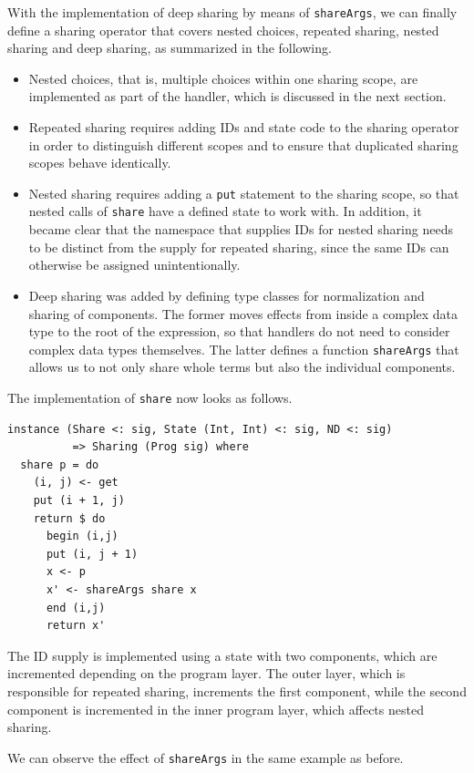 \documentclass[a4paper, 11pt, fleqn, twoside, abstract=on]{scrreprt}
\newcommand{\hinl}[1]{\texttt{#1}}
\begin{document}
With the implementation of deep sharing by means of \hinl{shareArgs}, we can finally define a sharing operator that covers nested choices, repeated sharing, nested sharing and deep sharing, as summarized in the following.

\begin{itemize}
\item Nested choices, that is, multiple choices within one sharing scope, are implemented as part of the handler, which is discussed in the next section.
\item Repeated sharing requires adding IDs and state code to the sharing operator in order to distinguish different scopes and to ensure that duplicated sharing scopes behave identically.
\item Nested sharing requires adding a \hinl{put} statement to the sharing scope, so that nested calls of \hinl{share} have a defined state to work with.
      In addition, it became clear that the namespace that supplies IDs for nested sharing needs to be distinct from the supply for repeated sharing, since the same IDs can otherwise be assigned unintentionally.
\item Deep sharing was added by defining type classes for normalization and sharing of components.
      The former moves effects from inside a complex data type to the root of the expression, so that handlers do not need to consider complex data types themselves.
      The latter defines a function \hinl{shareArgs} that allows us to not only share whole terms but also the individual components.
\end{itemize}
\noindent
The implementation of \hinl{share} now looks as follows.

\begin{verbatim}
instance (Share <: sig, State (Int, Int) <: sig, ND <: sig) 
          => Sharing (Prog sig) where
  share p = do
    (i, j) <- get
    put (i + 1, j)
    return $ do
      begin (i,j)
      put (i, j + 1)
      x <- p
      x' <- shareArgs share x
      end (i,j)
      return x'
\end{verbatim}
\noindent
The ID supply is implemented using a state with two components, which are incremented depending on the program layer.
The outer layer, which is responsible for repeated sharing, increments the first component, while the second component is incremented in the inner program layer, which affects nested sharing.

We can observe the effect of \hinl{shareArgs} in the same example as before.
\end{document}
